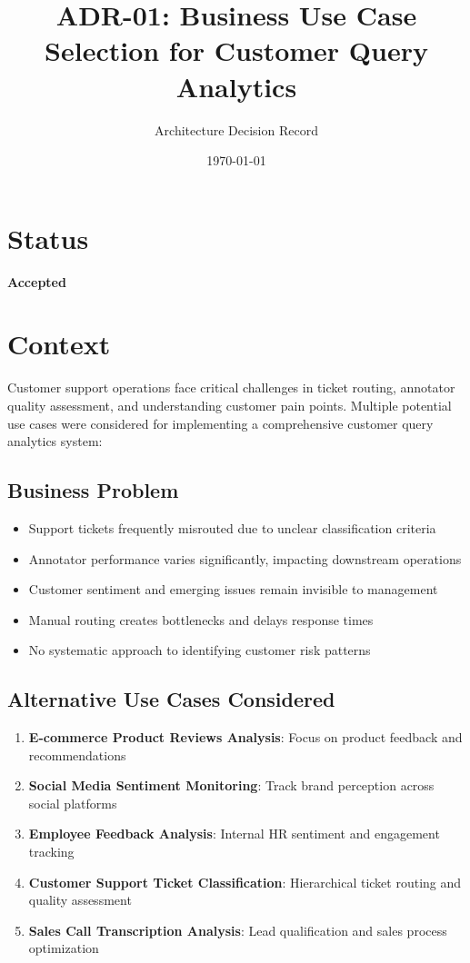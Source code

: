 \documentclass[11pt]{article}
\title{\textbf{ADR-01: Business Use Case Selection for Customer Query Analytics}}
\author{Architecture Decision Record}
\date{\today}
\begin{document}
\maketitle

\section{Status}
\textbf{Accepted}

\section{Context}

Customer support operations face critical challenges in ticket routing, annotator quality assessment, and understanding customer pain points. Multiple potential use cases were considered for implementing a comprehensive customer query analytics system:

\subsection{Business Problem}
\begin{itemize}
\item Support tickets frequently misrouted due to unclear classification criteria
\item Annotator performance varies significantly, impacting downstream operations
\item Customer sentiment and emerging issues remain invisible to management
\item Manual routing creates bottlenecks and delays response times
\item No systematic approach to identifying customer risk patterns
\end{itemize}

\subsection{Alternative Use Cases Considered}
\begin{enumerate}
\item \textbf{E-commerce Product Reviews Analysis}: Focus on product feedback and recommendations
\item \textbf{Social Media Sentiment Monitoring}: Track brand perception across social platforms  
\item \textbf{Employee Feedback Analysis}: Internal HR sentiment and engagement tracking
\item \textbf{Customer Support Ticket Classification}: Hierarchical ticket routing and quality assessment
\item \textbf{Sales Call Transcription Analysis}: Lead qualification and sales process optimization
\end{enumerate}
\end{document}
